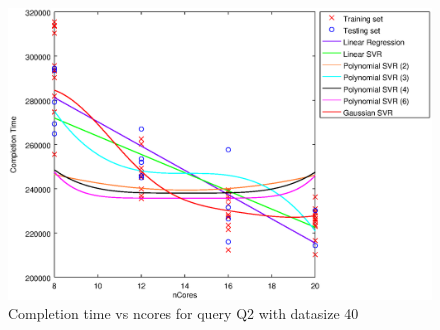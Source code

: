 
\begin {figure}[hbtp]
\centering
\includegraphics[width=\textwidth]{output/Q2_40_ONLY_NCORES/plot_Q2_40.eps}
\caption{Completion time vs ncores for query Q2 with datasize 40}
\label{fig:all_linear_Q2_40}
\end {figure}
